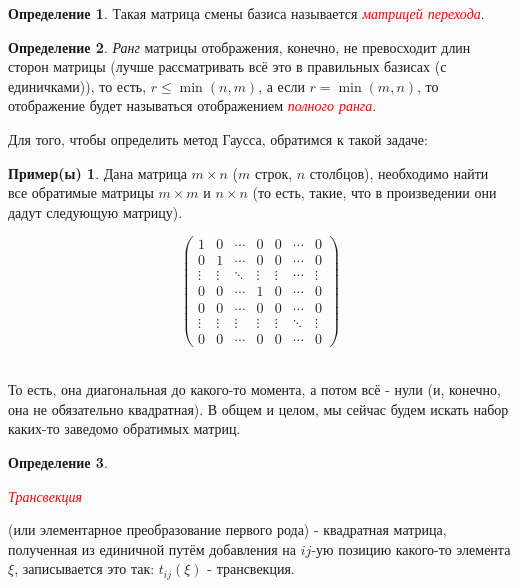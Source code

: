 \documentclass[a4paper,100pt]{article}
\theoremstyle{indented}
\theoremstyle{definition}
\newtheorem{defn}{Определение}
\newtheorem{exl}{Пример(ы)}
\theoremstyle{remark}
\begin{document}
\begin{defn}
    Такая матрица смены базиса называется \hypertarget{n55}{\textcolor{red}{\textit{матрицей перехода}}}.
\end{defn}

\begin{defn}
    \textit{Ранг} матрицы отображения, конечно, не превосходит длин сторон матрицы (лучше рассматривать всё это в правильных базисах (с единичками)), то есть, $r\leq \min(n, m)$, а если $r=\min(m,n)$, то отображение будет называться отображением \hypertarget{n57}{\textcolor{red}{\textit{полного ранга}}}.
\end{defn}

Для того, чтобы определить метод Гаусса, обратимся к такой задаче:

\begin{exl}
    Дана матрица $m\times n$ ($m$ строк, $n$ столбцов), необходимо найти все обратимые матрицы $m\times m$ и $n\times n$ (то есть, такие, что в произведении они дадут следующую матрицу).
\end{exl}

\begin{equation*}
    \begin{pmatrix}
        1 & 0 & \cdots & 0 & 0 & \cdots & 0 \\
        0 & 1 & \cdots & 0 & 0 & \cdots & 0 \\
        \vdots & \vdots & \ddots & \vdots & \vdots & \cdots & \vdots \\
        0 & 0 & \cdots & 1 & 0 & \cdots & 0 \\
        0 & 0 & \cdots & 0 & 0 & \cdots & 0 \\
        \vdots & \vdots & \vdots & \vdots & \vdots & \ddots & \vdots \\
        0 & 0 & \cdots & 0 & 0 & \cdots & 0
    \end{pmatrix}
\end{equation*}\

То есть, она диагональная до какого-то момента, а потом всё - нули (и, конечно, она не обязательно квадратная). В общем и целом, мы сейчас будем искать набор каких-то заведомо обратимых матриц. \

\begin{defn}
    \hypertarget{n58}{\textcolor{red}{\textit{Трансвекция}}} (или элементарное преобразование первого рода) - квадратная матрица, полученная из единичной путём добавления на $ij$-ую позицию какого-то элемента $\xi$, записывается это так: $t_{ij}(\xi)$ - трансвекция.
\end{defn}
\end{document}
